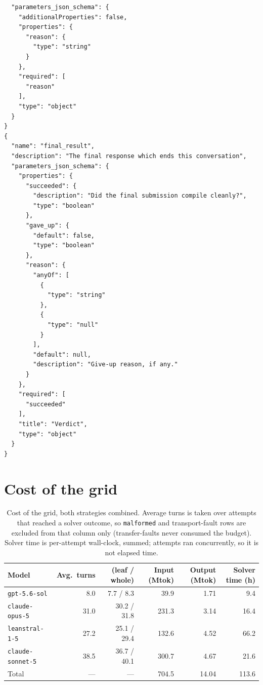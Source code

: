 \documentclass{article}
\begin{document}
\begin{lstlisting}
  "parameters_json_schema": {
    "additionalProperties": false,
    "properties": {
      "reason": {
        "type": "string"
      }
    },
    "required": [
      "reason"
    ],
    "type": "object"
  }
}
{
  "name": "final_result",
  "description": "The final response which ends this conversation",
  "parameters_json_schema": {
    "properties": {
      "succeeded": {
        "description": "Did the final submission compile cleanly?",
        "type": "boolean"
      },
      "gave_up": {
        "default": false,
        "type": "boolean"
      },
      "reason": {
        "anyOf": [
          {
            "type": "string"
          },
          {
            "type": "null"
          }
        ],
        "default": null,
        "description": "Give-up reason, if any."
      }
    },
    "required": [
      "succeeded"
    ],
    "title": "Verdict",
    "type": "object"
  }
}
\end{lstlisting}

\section{Cost of the grid}
\label{app:cost}

\begin{table}[h]
  \caption{Cost of the grid, both strategies combined. Average turns is taken over attempts that reached a solver outcome, so \texttt{malformed} and transport-fault rows are excluded from that column only (transfer-faults never consumed the budget). Solver time is per-attempt wall-clock, summed; attempts ran concurrently, so it is not elapsed time.}
  \label{tab:cost}
  \centering
  \small
  \begin{tabular}{lrrrrr}
    \toprule
    Model & Avg.\ turns & (leaf / whole) & Input (Mtok) & Output (Mtok) & Solver time (h) \\
    \midrule
    \texttt{gpt-5.6-sol}     & 8.0  & 7.7 / 8.3   & 39.9  & 1.71  & 9.4  \\
    \texttt{claude-opus-5}   & 31.0 & 30.2 / 31.8 & 231.3 & 3.14  & 16.4 \\
    \texttt{leanstral-1-5}   & 27.2 & 25.1 / 29.4 & 132.6 & 4.52  & 66.2 \\
    \texttt{claude-sonnet-5} & 38.5 & 36.7 / 40.1 & 300.7 & 4.67  & 21.6 \\
    \midrule
    Total                    & ---  & ---         & 704.5 & 14.04 & 113.6 \\
    \bottomrule
  \end{tabular}
\end{table}
\end{document}
